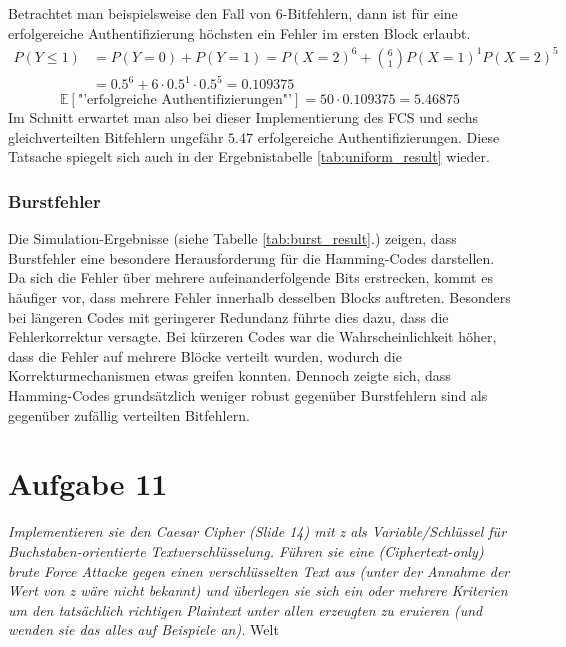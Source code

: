 \documentclass{article}
\begin{document}
    Betrachtet man beispielsweise den Fall von 6-Bitfehlern, dann ist für eine erfolgereiche Authentifizierung
    höchsten ein Fehler im ersten Block erlaubt.
    \begin{align*}
        P(Y \leq 1) &= P(Y = 0) + P(Y = 1) = P(X=2)^{6} + {6\choose 1}P(X=1)^1P(X=2)^{5}\\
        &=0.5^{6} + 6\cdot 0.5^1 \cdot 0.5^5 = 0.109375
    \end{align*}
    \[
        \mathbb{E}\left[\text{"'erfolgreiche Authentifizierungen"'}\right] =  50 \cdot 0.109375 = 5.46875
    \]
    Im Schnitt erwartet man also bei dieser Implementierung des FCS und sechs gleichverteilten Bitfehlern 
    ungefähr $5.47$ erfolgereiche Authentifizierungen. Diese Tatsache spiegelt sich auch in der Ergebnistabelle 
    \ref{tab:uniform_result} wieder.

    
    \subsubsection{Burstfehler}  
    Die Simulation-Ergebnisse (siehe Tabelle \ref{tab:burst_result}.) zeigen, dass Burstfehler eine besondere Herausforderung für die Hamming-Codes darstellen. 
    Da sich die Fehler über mehrere aufeinanderfolgende Bits erstrecken, kommt es häufiger vor, dass mehrere Fehler 
    innerhalb desselben Blocks auftreten. Besonders bei längeren Codes mit geringerer Redundanz führte dies dazu, 
    dass die Fehlerkorrektur versagte. Bei kürzeren Codes war die Wahrscheinlichkeit höher, dass die Fehler auf mehrere 
    Blöcke verteilt wurden, wodurch die Korrekturmechanismen etwas greifen konnten. Dennoch zeigte sich, 
    dass Hamming-Codes grundsätzlich weniger robust gegenüber Burstfehlern sind als gegenüber zufällig verteilten 
    Bitfehlern.
    
    
    \section{Aufgabe 11}
    \textit{Implementieren sie den Caesar Cipher (Slide 14) mit z als Variable/Schlüssel für
    Buchstaben-orientierte Textverschlüsselung. Führen sie eine (Ciphertext-only) brute
    Force Attacke gegen einen verschlüsselten Text aus (unter der Annahme der Wert
    von z wäre nicht bekannt) und überlegen sie sich ein oder mehrere Kriterien um den
    tatsächlich richtigen Plaintext unter allen erzeugten zu eruieren (und wenden sie das
    alles auf Beispiele an).}\vspace*{1em}\newline
    \newpage
    Welt
    \newpage
    
    
\end{document}
